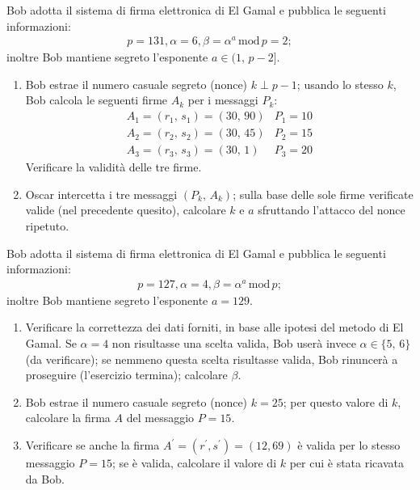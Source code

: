         Bob adotta il sistema di firma elettronica di El Gamal e pubblica le seguenti informazioni:
        \begin{gather*}
            p=131, \alpha = 6, \beta = \alpha^a\,\mathrm{mod}\,p=2
        ;\end{gather*}
        inoltre Bob mantiene segreto l'esponente $a\in (1,\,p-2]$.
        \begin{enumerate}
            \item Bob estrae il numero casuale segreto (nonce) $k\perp p-1$; usando lo stesso $k$, 
                Bob calcola le seguenti firme $A_k$ per i messaggi $P_k$:
                \[\begin{array}{ll}
                    A_1=(r_1,\,s_1)=(30,\,90) & P_1=10\\
                    A_2=(r_2,\,s_2)=(30,\,45) & P_2=15\\
                    A_3=(r_3,\,s_3)=(30,\,1) & P_3=20
                \end{array}\]
                Verificare la validità delle tre firme.
            \item Oscar intercetta i tre messaggi $(P_k,\,A_k)$; sulla base delle sole firme verificate valide 
                (nel precedente quesito), calcolare $k$ e $a$ sfruttando l'attacco del nonce ripetuto.
        \end{enumerate}

        Bob adotta il sistema di firma elettronica di El Gamal e pubblica le seguenti informazioni:
        \begin{gather*}
            p=127, \alpha = 4, \beta = \alpha^a\,\mathrm{mod}\,p
        ;\end{gather*}
        inoltre Bob mantiene segreto l'esponente $a=129$.
        \begin{enumerate}
            \item Verificare la correttezza dei dati forniti, in base alle ipotesi del metodo di El Gamal. 
                Se $\alpha=4$ non risultasse una scelta valida, Bob userà invece $\alpha\in \{5,\,6\}$ 
                (da verificare); se nemmeno questa scelta risultasse valida, Bob rinuncerà a proseguire 
                (l'esercizio termina); calcolare $\beta$.
            \item Bob estrae il numero casuale segreto (nonce) $k=25$; per questo valore di $k$, calcolare 
                la firma $A$ del messaggio $P=15$.
            \item Verificare se anche la firma $A^{\prime}=(r^{\prime}, s^{\prime})=(12,69)$ è valida per 
                lo stesso messaggio $P=15$; se è valida, calcolare il valore di $k$ per cui è stata ricavata da Bob.
        \end{enumerate}
